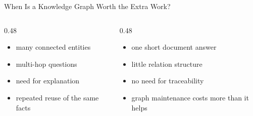\documentclass[aspectratio=169]{beamer}
\begin{document}
\begin{frame}{When Is a Knowledge Graph Worth the Extra Work?}
\begin{columns}[T,onlytextwidth]
  \begin{column}{0.48\textwidth}
    \begin{tcolorbox}[colback=plainbg,colframe=plainframe,boxrule=0.7pt,title=Good fit]
    \begin{itemize}
      \item many connected entities
      \item multi-hop questions
      \item need for explanation
      \item repeated reuse of the same facts
    \end{itemize}
    \end{tcolorbox}
  \end{column}
  \begin{column}{0.48\textwidth}
    \begin{tcolorbox}[colback=questionbg,colframe=questionframe,boxrule=0.7pt,title=Weak fit]
    \begin{itemize}
      \item one short document answer
      \item little relation structure
      \item no need for traceability
      \item graph maintenance costs more than it helps
    \end{itemize}
    \end{tcolorbox}
  \end{column}
\end{columns}
\end{frame}
\end{document}

